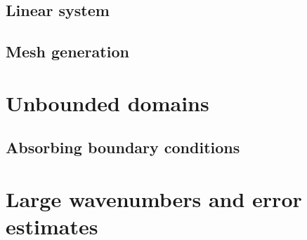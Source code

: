 \documentclass[a4paper]{article}
\begin{document}
\subsection{Linear system}

\subsection{Mesh generation}


\section{Unbounded domains}

\subsection{Absorbing boundary conditions}


\section{Large wavenumbers and error estimates}
\end{document}
